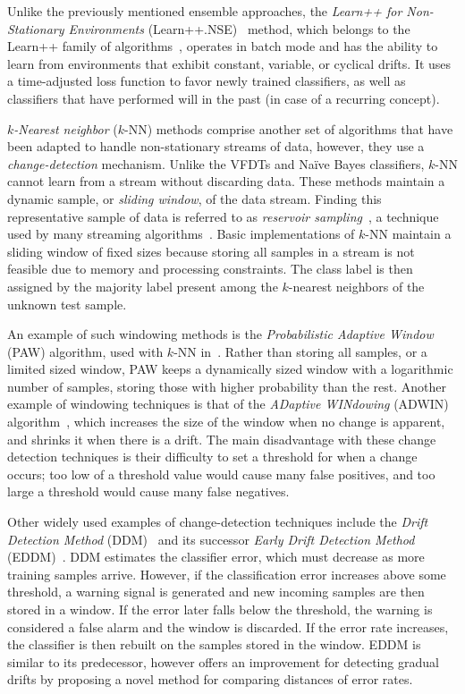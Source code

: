 \documentclass[reqno]{vcuthesis}
\numberwithin{equation}{chapter}
\begin{document}
Unlike the previously mentioned ensemble approaches, the \textit{Learn++ for Non-Stationary Environments} (Learn++.NSE)~\cite{elwell2011incremental} method, which belongs to the Learn++ family of algorithms~\cite{polikar2001learn}, operates in batch mode and has the ability to learn from environments that exhibit constant, variable, or cyclical drifts. It uses a time-adjusted loss function to favor newly trained classifiers, as well as classifiers that have performed will in the past (in case of a recurring concept). 

\textit{$k$-Nearest neighbor} ($k$-NN) methods comprise another set of algorithms that have been adapted to handle non-stationary streams of data, however, they use a \textit{change-detection} mechanism. Unlike the VFDTs and Na\"{i}ve Bayes classifiers, $k$-NN cannot learn from a stream without discarding data. These methods maintain a dynamic sample, or \textit{sliding window}, of the data stream. Finding this representative sample of data is referred to as \textit{reservoir sampling}~\cite{vitter1985random}, a technique used by many streaming algorithms~\cite{ditzler2015learning}. Basic implementations of $k$-NN maintain a sliding window of fixed sizes because storing all samples in a stream is not feasible due to memory and processing constraints. The class label is then assigned by the majority label present among the $k$-nearest neighbors of the unknown test sample. 

An example of such windowing methods is the \textit{Probabilistic Adaptive Window} (PAW) algorithm, used with $k$-NN in~\cite{bifet2013efficient}. Rather than storing all samples, or a limited sized window, PAW keeps a dynamically sized window with a logarithmic number of samples, storing those with higher probability than the rest. Another example of windowing techniques is that of the \textit{ADaptive WINdowing} (ADWIN) algorithm~\cite{bifet2007learning}, which increases the size of the window when no change is apparent, and shrinks it when there is a drift. The main disadvantage with these change detection techniques is their difficulty to set a threshold for when a change occurs; too low of a threshold value would cause many false positives, and too large a threshold would cause many false negatives. 

Other widely used examples of change-detection techniques include the \textit{Drift Detection Method} (DDM)~\cite{gama2004learning} and its successor \textit{Early Drift Detection Method} (EDDM)~\cite{baena2006early}. DDM estimates the classifier error, which must decrease as more training samples arrive. However, if the classification error increases above some threshold, a warning signal is generated and new incoming samples are then stored in a window. If the error later falls below the threshold, the warning is considered a false alarm and the window is discarded. If the error rate increases, the classifier is then rebuilt on the samples stored in the window. EDDM is similar to its predecessor, however offers an improvement for detecting gradual drifts by proposing a novel method for comparing distances of error rates.
\end{document}
